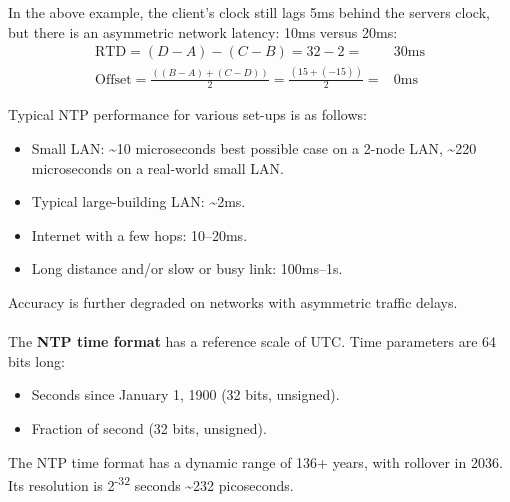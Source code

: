 \documentclass[a4paper,11pt]{article}
\begin{document}
In the above example, the client's clock still lags 5ms behind the servers clock, but there is an asymmetric network latency: 10ms versus 20ms:
\begin{align*}
    \text{RTD}      = (D-A)-(C-B) = 32-2                                =& 30\text{ms} \\
    \text{Offset}   = \frac{((B-A)+(C-D))}{2} = \frac{(15 + (-15))}{2}  =& 0\text{ms}
\end{align*}

Typical NTP performance for various set-ups is as follows:
\begin{itemize}
    \item   Small LAN: \sim10 microseconds best possible case on a 2-node LAN, \sim220 microseconds on a real-world small LAN.
    \item   Typical large-building LAN: \sim2ms.
    \item   Internet with a few hops: 10–20ms.
    \item   Long distance and/or slow or busy link: 100ms–1s.
\end{itemize}

Accuracy is further degraded on networks with asymmetric traffic delays.
\\\\
The \textbf{NTP time format} has a reference scale of UTC.
Time parameters are 64 bits long:
\begin{itemize}
    \item   Seconds since January 1, 1900 (32 bits, unsigned).
    \item   Fraction of second (32 bits, unsigned).
\end{itemize}
The NTP time format has a dynamic range of 136+ years, with rollover in 2036.
Its resolution is 2\textsuperscript{-32} seconds \sim232 picoseconds.
\end{document}
